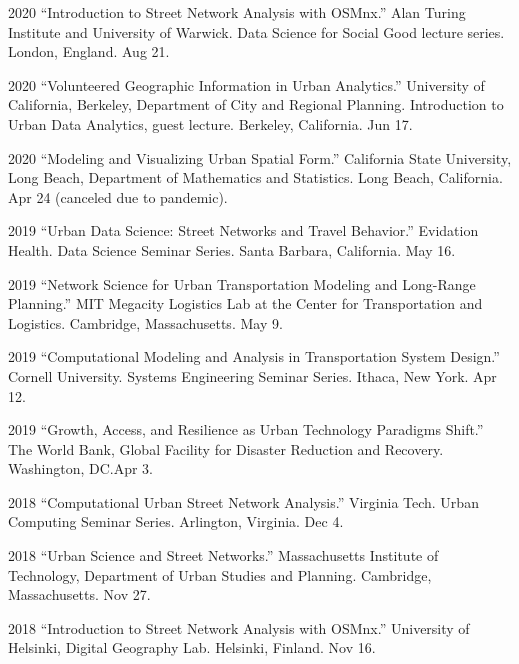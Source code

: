 \documentclass[12pt,letterpaper]{report}
\begin{document}
\begin{tablist}
        \item[2020] \tab{}\enquote{Introduction to Street Network Analysis with OSMnx.} Alan Turing Institute and University of Warwick. Data Science for Social Good lecture series. London, England. Aug 21.

        \item[2020] \tab{}\enquote{Volunteered Geographic Information in Urban Analytics.} University of California, Berkeley, Department of City and Regional Planning. Introduction to Urban Data Analytics, guest lecture. Berkeley, California. Jun 17.

        \item[2020] \tab{}\enquote{Modeling and Visualizing Urban Spatial Form.} California State University, Long Beach, Department of Mathematics and Statistics. Long Beach, California. Apr 24 (canceled due to pandemic).

        \item[2019] \tab{}\enquote{Urban Data Science: Street Networks and Travel Behavior.} Evidation Health. Data Science Seminar Series. Santa Barbara, California. May 16.

        \item[2019] \tab{}\enquote{Network Science for Urban Transportation Modeling and Long-Range Planning.} MIT Megacity Logistics Lab at the Center for Transportation and Logistics. Cambridge, Massachusetts. May 9.

        \item[2019] \tab{}\enquote{Computational Modeling and Analysis in Transportation System Design.} Cornell University. Systems Engineering Seminar Series. Ithaca, New York. Apr 12.

        \item[2019] \tab{}\enquote{Growth, Access, and Resilience as Urban Technology Paradigms Shift.} The World Bank, Global Facility for Disaster Reduction and Recovery. Washington, DC.\@ Apr 3.

        \item[2018] \tab{}\enquote{Computational Urban Street Network Analysis.} Virginia Tech. Urban Computing Seminar Series. Arlington, Virginia. Dec 4.

        \item[2018] \tab{}\enquote{Urban Science and Street Networks.} Massachusetts Institute of Technology, Department of Urban Studies and Planning. Cambridge, Massachusetts. Nov 27.

        \item[2018] \tab{}\enquote{Introduction to Street Network Analysis with OSMnx.} University of Helsinki, Digital Geography Lab. Helsinki, Finland. Nov 16.


\end{tablist}
\end{document}
